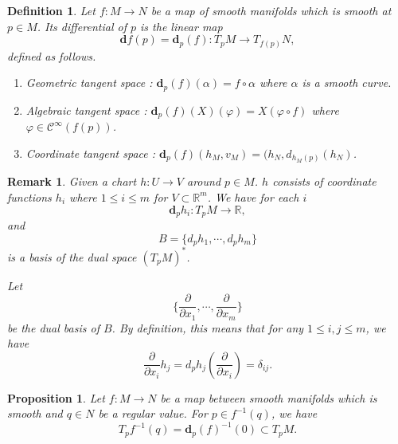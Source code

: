 \documentclass{article}
\newtheorem{proposition}{Proposition}[section]
\newtheorem{definition}{Definition}[section]
\newtheorem{remark}{Remark}[section]
\numberwithin{equation}{section}
\begin{document}
\begin{definition}
Let $f:M\to N$ be a map of smooth manifolds which is smooth at $p\in M$. Its differential of $p$ is the linear map
\begin{equation*}
\mathbf{d}f(p) = \mathbf{d}_p(f):T_pM\to T_{f(p)}N,
\end{equation*}
defined as follows.
\begin{enumerate}[1).]
\item Geometric tangent space : $\mathbf{d}_p(f)(\alpha) = f\circ\alpha$ where $\alpha$ is a smooth curve.
\item Algebraic tangent space : $\mathbf{d}_p(f)(X)(\varphi) = X(\varphi\circ f)$ where $\varphi\in\mathcal{C}^\infty(f(p))$.
\item Coordinate tangent space : $\mathbf{d}_p(f)(h_M,v_M) = (h_N,d_{h_M(p)}(h_N)$.
\end{enumerate}
\end{definition}

\begin{remark}
Given a chart $h:U\to V$ around $p\in M$. $h$ consists of coordinate functions $h_i$ where $1\leq i\leq m$ for $V\subset\mathbb{R}^m$. We have for each $i$
\begin{equation*}
\mathbf{d}_ph_i:T_pM\to\mathbb{R},
\end{equation*}
and 
\begin{equation*}
B=\{d_ph_1,\cdots,d_ph_m\}
\end{equation*}
is a basis of the dual space $(T_pM)^*$.\\
\par Let 
\begin{equation*}
\{{\frac {\partial} {\partial x_1}},\cdots,{\frac {\partial} {\partial x_m}}\}
\end{equation*}
be the dual basis of $B$. By definition, this means that for any $1\leq i,j\leq m$, we have
\begin{equation*}
{\frac {\partial} {\partial x_i}}h_j = d_ph_j({\frac {\partial} {\partial x_i}}) = \delta_{ij}.
\end{equation*}
\end{remark}

\begin{proposition}
Let $f:M\to N$ be a map between smooth manifolds which is smooth and $q\in N$ be a regular value. For $p\in f^{-1}(q)$, we have
\begin{equation*}
T_pf^{-1}(q) = \mathbf{d}_p(f)^{-1}(0)\subset T_pM.
\end{equation*}
\end{proposition}
\end{document}
